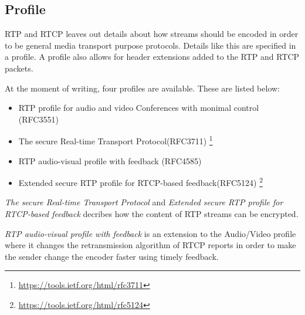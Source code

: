 \subsection{Profile} \label{sec:design:profile}
RTP and RTCP leaves out details about how streams should be encoded in order to be general media transport purpose protocols. Details like this are specified in a profile. A profile also allows for header extensions added to the RTP and RTCP packets.



At the moment of writing, four profiles are available. These are listed below:

\begin{itemize}
	\item RTP profile for audio and video Conferences with monimal control (RFC3551)
	\item The secure Real-time Transport Protocol(RFC3711) \footnote{\url{https://tools.ietf.org/html/rfc3711}}
	\item RTP audio-visual profile with feedback (RFC4585)
	\item Extended secure RTP profile for RTCP-based feedback(RFC5124) \footnote{\url{https://tools.ietf.org/html/rfc5124}}
\end{itemize} \citep{johnston2004sip}

\textit{The secure Real-time Transport Protocol} and \textit{Extended secure RTP profile for RTCP-based feedback} decribes how the content of RTP streams can be encrypted.

\textit{RTP audio-visual profile with feedback} is an extension to the Audio/Video profile where it changes the retransmission algorithm of RTCP reports in order to make the sender change the encoder faster using timely feedback. \citep{RFC4585}

